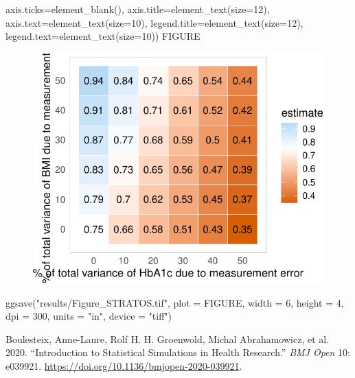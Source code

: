 \documentclass[
  letterpaper,
  DIV=11,
  numbers=noendperiod]{scrartcl}
\newenvironment{Shaded}{\begin{snugshade}}{\end{snugshade}}
\newcommand{\AttributeTok}[1]{\textcolor[rgb]{0.40,0.45,0.13}{#1}}
\newcommand{\DecValTok}[1]{\textcolor[rgb]{0.68,0.00,0.00}{#1}}
\newcommand{\FunctionTok}[1]{\textcolor[rgb]{0.28,0.35,0.67}{#1}}
\newcommand{\NormalTok}[1]{\textcolor[rgb]{0.00,0.23,0.31}{#1}}
\newcommand{\StringTok}[1]{\textcolor[rgb]{0.13,0.47,0.30}{#1}}
\newlength{\cslhangindent}
\newlength{\cslentryspacingunit} %
\newenvironment{CSLReferences}[2] %
 {%
  \setlength{\parindent}{0pt}
  \ifodd #1
  \let\oldpar\par
  \def\par{\hangindent=\cslhangindent\oldpar}
  \fi
  \setlength{\parskip}{#2\cslentryspacingunit}
 }%
 {}
\begin{document}
\begin{Shaded}
\begin{Highlighting}[]
        \AttributeTok{axis.ticks=}\FunctionTok{element\_blank}\NormalTok{(),}
        \AttributeTok{axis.title=}\FunctionTok{element\_text}\NormalTok{(}\AttributeTok{size=}\DecValTok{12}\NormalTok{),}
        \AttributeTok{axis.text=}\FunctionTok{element\_text}\NormalTok{(}\AttributeTok{size=}\DecValTok{10}\NormalTok{),}
        \AttributeTok{legend.title=}\FunctionTok{element\_text}\NormalTok{(}\AttributeTok{size=}\DecValTok{12}\NormalTok{),}
        \AttributeTok{legend.text=}\FunctionTok{element\_text}\NormalTok{(}\AttributeTok{size=}\DecValTok{10}\NormalTok{))}
\NormalTok{FIGURE}
\end{Highlighting}
\end{Shaded}

\begin{figure}[H]

{\centering \includegraphics{manuscript_files/figure-pdf/unnamed-chunk-8-1.pdf}

}

\end{figure}

\begin{Shaded}
\begin{Highlighting}[]
\FunctionTok{ggsave}\NormalTok{(}\StringTok{"results/Figure\_STRATOS.tif"}\NormalTok{,}
       \AttributeTok{plot   =}\NormalTok{ FIGURE,}
       \AttributeTok{width  =} \DecValTok{6}\NormalTok{,}
       \AttributeTok{height =} \DecValTok{4}\NormalTok{,}
       \AttributeTok{dpi    =} \DecValTok{300}\NormalTok{,}
       \AttributeTok{units  =} \StringTok{"in"}\NormalTok{,}
       \AttributeTok{device =} \StringTok{"tiff"}\NormalTok{)}
\end{Highlighting}
\end{Shaded}

\hypertarget{refs}{}
\begin{CSLReferences}{1}{0}
\leavevmode{}%
Boulesteix, Anne-Laure, Rolf H. H. Groenwold, Michal Abrahamowicz, et
al. 2020. {``Introduction to Statistical Simulations in Health
Research.''} \emph{BMJ Open} 10: e039921.
\url{https://doi.org/10.1136/bmjopen-2020-039921}.

\end{CSLReferences}
\end{document}
